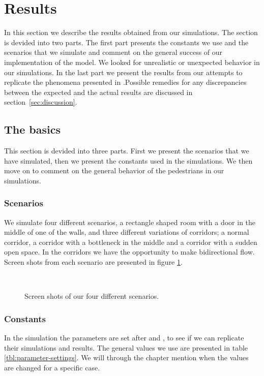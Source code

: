 \section{Results}
\label{sec:results}
In this section we describe the results obtained from our simulations.
The section is devided into two parts. The first part presents the
constants we use and the scenarios that we simulate and comment on
the general success of our implementation of the model. We looked
for unrealistic or unexpected behavior in our simulations. In the
last part we present the results from our attempts to replicate
the phenomena presented in \cite{self-org}.Possible remedies for
any discrepancies between the expected and the actual results are
discussed in section~\ref{sec:discussion}.

\subsection{The basics}
This section is devided into three parts. First we present the
scenarios that we have simulated, then we present the constants
used in the simulations. We then move on to comment on the
general behavior of the pedestrians in our simulations.

\subsubsection{Scenarios}
We simulate four different scenarios, a rectangle shaped room with a
door in the middle of one of the walls, and three different variations
of corridors; a normal corridor, a corridor with a bottleneck in the
middle and a corridor with a sudden open space. In the corridors we have
the opportunity to make bidirectional flow. Screen shots from each
scenario are presented in figure \ref{fig:fourcases}.

\begin{figure}[h]
\centering
{}
\subfloat[Bottleneck.]{\resizebox{7cm}{!}{}}\\
\subfloat[Corridor.]{\resizebox{7cm}{!}{}}
\caption{Screen shots of our four different scenarios.}
\label{fig:fourcases}
\end{figure}

\subsubsection{Constants}
In the simulation the parameters are set after \cite{ABconstant} and
\cite{self-org}, to see if we can replicate their simulations and results.
The general values we use are presented in table \ref{tbl:parameter-settings}.
We will through the chapter mention when the values are changed for a
specific case.

